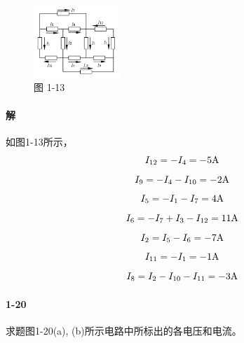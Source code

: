 \documentclass[hyperref, UTF8]{ctexart}
\begin{document}
\begin{figure}[!htb]
  \centering
  \includegraphics[width=0.292\textwidth]{p1-13.png}
  \caption*{图 1-13}
\end{figure}

\paragraph{解}
如图1-13所示，
$$ I_{12}=-I_4=-5{\rm A}$$
$$ I_9=-I_4-I_{10}=-2{\rm A}$$
$$ I_5=-I_1-I_7=4{\rm A}$$
$$ I_6=-I_7+I_3-I_{12}=11{\rm A}$$
$$ I_2=I_5-I_6=-7{\rm A}$$
$$ I_{11}=-I_1=-1{\rm A}$$
$$ I_8=I_2-I_{10}-I_{11}=-3{\rm A}$$

\paragraph{1-20} \label{1-20}
求题图1-20(a), (b)所示电路中所标出的各电压和电流。
\end{document}
